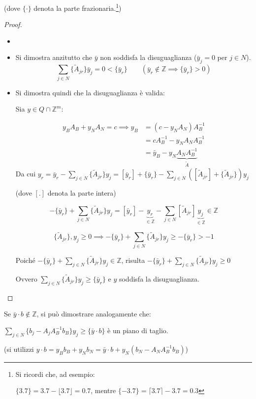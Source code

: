 \documentclass[a4paper,11pt]{book}
\newcommand{\integers}{\mathbb{Z}}
\newcommand{\dsum}{\displaystyle\sum}
\theoremstyle{break}
\begin{document}
(dove $\{\cdot\}$ denota la parte frazionaria.\footnote{Si ricordi che, ad esempio:

$\{3.7\} = 3.7 - \lfloor 3.7 \rfloor = 0.7$, mentre $\{-3.7\} = \lceil 3.7 \rceil - 3.7 = 0.3$})
\newpage
\begin{proof}
\begin{itemize}\small
 \item[]
 \item Si dimostra anzitutto che $\bar y$ non soddisfa la disuguaglianza ($\bar y_j = 0$ per $j \in N$).
 \[\sum_{j \in N} \{\tilde A_{jr}\} \bar y_j = 0 < \{\bar y_r\} \quad\quad (\bar y_r \notin \integers \implies \{\bar y_r\} > 0)\]
 \item Si dimostra quindi che la disuguaglianza è valida:
 
 Sia $y \in Q \cap \integers^m$:
 
 \[\begin{aligned}
    y_BA_B + y_NA_N = c \implies y_B &= (c-y_N A_N)A^{-1}_B\\
                                     &= cA^{-1}_B - y_N A_N A^{-1}_B\\
                                     &= \bar y_B - y_N \underbrace{A_N A^{-1}_B}_{\tilde A}
   \end{aligned}
\]
Da cui $y_r = \bar y_r - \dsum_{j \in N} \{\tilde A_{jr}\}y_j = [\bar y_r] + \{\bar y_r\} - \dsum_{j \in N} ([\tilde A_{jr}] + \{\tilde A_{jr}\})y_j$

(dove $[.]$ denota la parte intera)

\[-\{ \bar y_r \} + \dsum_{j \in N} \{ \tilde A_{jr} \} y_j = [\bar y_r] - \underbrace{y_r}_{\in \integers} - \dsum_{j \in N} [\tilde A_{jr}] \underbrace{y_j}_{\in \integers} \in \integers\]

\[\{\tilde A_{jr}\}, y_j \geq 0 \implies -\{\bar y_r\} + \dsum_{j \in N} \{\tilde A_{jr}\} y_j \geq -\{ \bar y_r \} > -1\]

Poiché $-\{\bar y_r\} + \sum\limits_{j \in N} \{\tilde A_{jr}\} y_j \in \integers$, risulta $-\{\bar y_r\} + \sum\limits_{j \in N} \{\tilde A_{jr}\} y_j \geq 0$

Ovvero $\sum\limits_{j \in N} \{\tilde A_{jr}\} y_j \geq \{\bar y_r\}$ e $y$ soddisfa la disuguaglianza.
\end{itemize}

\end{proof}
{\footnotesize

Se $\bar y \cdot b \notin \mathbb Z$, si può dimostrare analogamente che:

\begin{center}
 $\dsum_{j \in N} \{b_j - A_j A^{-1}_Bb_B\} y_j \geq \{\bar y \cdot b\}$ è un piano di taglio.\smallskip
 
 (si utilizzi $y\cdot b = y_Bb_B + y_Nb_N = \bar y \cdot b + y_N(b_N - A_N A^{-1}_Bb_B)$)
\end{center}



}\bigskip
\end{document}
